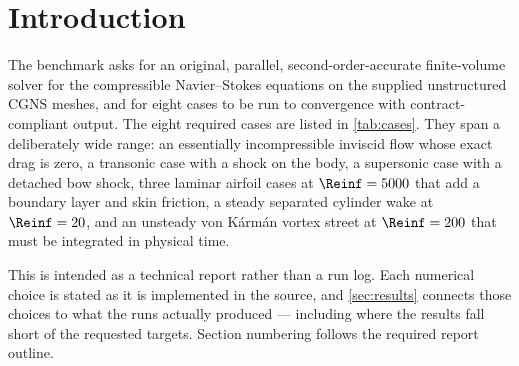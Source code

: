 \section{Introduction}
\label{sec:intro}

The benchmark asks for an original, parallel, second-order-accurate
finite-volume solver for the compressible Navier--Stokes equations on the
supplied unstructured CGNS meshes, and for eight cases to be run to
convergence with contract-compliant output. The eight required cases are
listed in \cref{tab:cases}. They span a deliberately wide range: an
essentially incompressible inviscid flow whose exact drag is zero, a transonic
case with a shock on the body, a supersonic case with a detached bow shock,
three laminar airfoil cases at $\Reinf=5000$ that add a boundary layer and
skin friction, a steady separated cylinder wake at $\Reinf=20$, and an
unsteady von K\'arm\'an vortex street at $\Reinf=200$ that must be integrated
in physical time.

This is intended as a technical report rather than a run log. Each numerical
choice is stated as it is implemented in the source, and \cref{sec:results}
connects those choices to what the runs actually produced --- including where
the results fall short of the requested targets. Section numbering follows the
required report outline.

